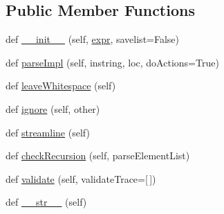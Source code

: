 \subsection*{Public Member Functions}
\begin{DoxyCompactItemize}
\item 
def \hyperlink{classpkg__resources_1_1__vendor_1_1pyparsing_1_1ParseElementEnhance_ad18f0af506a0d9477e2833556a00ac45}{\+\_\+\+\_\+init\+\_\+\+\_\+} (self, \hyperlink{classpkg__resources_1_1__vendor_1_1pyparsing_1_1ParseElementEnhance_a34e02b3404b2a545ca1be8b522758896}{expr}, savelist=False)
\item 
def \hyperlink{classpkg__resources_1_1__vendor_1_1pyparsing_1_1ParseElementEnhance_a416ca266b453970a966a59349a04d7be}{parse\+Impl} (self, instring, loc, do\+Actions=True)
\item 
def \hyperlink{classpkg__resources_1_1__vendor_1_1pyparsing_1_1ParseElementEnhance_a6c3493cab839bc356697e0658d250f46}{leave\+Whitespace} (self)
\item 
def \hyperlink{classpkg__resources_1_1__vendor_1_1pyparsing_1_1ParseElementEnhance_a231b3fb1c8e2eaeef3e2945185d8c005}{ignore} (self, other)
\item 
def \hyperlink{classpkg__resources_1_1__vendor_1_1pyparsing_1_1ParseElementEnhance_acb7eb731caefeb38fd3d56f9488ca85d}{streamline} (self)
\item 
def \hyperlink{classpkg__resources_1_1__vendor_1_1pyparsing_1_1ParseElementEnhance_a2011260e258d3f1dc75bfc090a7d70fd}{check\+Recursion} (self, parse\+Element\+List)
\item 
def \hyperlink{classpkg__resources_1_1__vendor_1_1pyparsing_1_1ParseElementEnhance_a84ea6a2aac0f4058a4e989a4284010d5}{validate} (self, validate\+Trace=\mbox{[}$\,$\mbox{]})
\item 
def \hyperlink{classpkg__resources_1_1__vendor_1_1pyparsing_1_1ParseElementEnhance_a798f354a741c69c5bdd8493b03c87836}{\+\_\+\+\_\+str\+\_\+\+\_\+} (self)
\end{DoxyCompactItemize}
